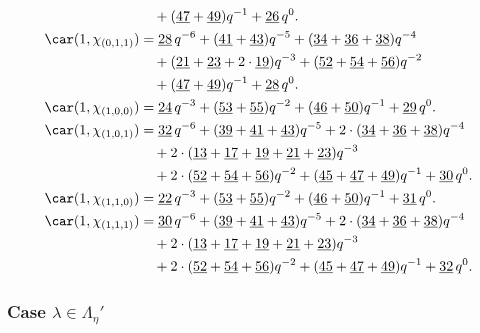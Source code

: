 \begin{align*}
	&\quad+(\underline{47}+\underline{49})q^{-1}+\underline{26}\,q^0.\\
	\car(1,\chi_{(0,1,1)})
	&=\underline{28}\,q^{-6}+(\underline{41}+\underline{43})q^{-5}+(\underline{34}+\underline{36}+\underline{38})q^{-4}\\
	&\quad+(\underline{21}+\underline{23}+2\cdot\underline{19})q^{-3}+(\underline{52}+\underline{54}+\underline{56})q^{-2}\\
	&\quad+(\underline{47}+\underline{49})q^{-1}+\underline{28}\,q^0.\\
	\car(1,\chi_{(1,0,0)})
	&=\underline{24}\,q^{-3}+(\underline{53}+\underline{55})q^{-2}+(\underline{46}+\underline{50})q^{-1}+\underline{29}\,q^0.\\
	\car(1,\chi_{(1,0,1)})
	&=\underline{32}\,q^{-6}+(\underline{39}+\underline{41}+\underline{43})q^{-5}+2\cdot(\underline{34}+\underline{36}+\underline{38})q^{-4}\\
	&\quad+2\cdot(\underline{13}+\underline{17}+\underline{19}+\underline{21}+\underline{23})q^{-3}\\
	&\quad+2\cdot(\underline{52}+\underline{54}+\underline{56})q^{-2}+(\underline{45}+\underline{47}+\underline{49})q^{-1}+\underline{30}\,q^0.\\
	\car(1,\chi_{(1,1,0)})
	&=\underline{22}\,q^{-3}+(\underline{53}+\underline{55})q^{-2}+(\underline{46}+\underline{50})q^{-1}+\underline{31}\,q^0.\\
	\car(1,\chi_{(1,1,1)})
	&=\underline{30}\,q^{-6}+(\underline{39}+\underline{41}+\underline{43})q^{-5}+2\cdot(\underline{34}+\underline{36}+\underline{38})q^{-4}\\
	&\quad+2\cdot(\underline{13}+\underline{17}+\underline{19}+\underline{21}+\underline{23})q^{-3}\\
	&\quad+2\cdot(\underline{52}+\underline{54}+\underline{56})q^{-2}+(\underline{45}+\underline{47}+\underline{49})q^{-1}+\underline{32}\,q^0.
\end{align*}

\subsubsection{Case $\lambda\in \Lambda_\eta'$}

